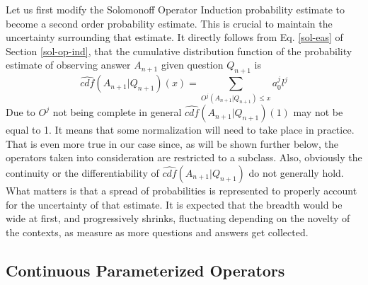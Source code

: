 \documentclass[runningheads]{llncs}
\begin{document}
Let us first modify the Solomonoff Operator Induction probability
estimate to become a second order probability estimate. This is
crucial to maintain the uncertainty surrounding that estimate.
It directly follows from Eq. \ref{sol-eas} of Section
\ref{sol-op-ind}, that the cumulative distribution function of the
probability estimate of observing answer $A_{n+1}$ given question
$Q_{n+1}$ is
\begin{equation}
  \label{sol-cdf}
\hat{cdf}(A_{n+1}|Q_{n+1})(x) = \sum_{O^j(A_{n+1}|Q_{n+1}) \le x} a_0^j l^j
\end{equation}
Due to $O^j$ not being complete in general
$\hat{cdf}(A_{n+1}|Q_{n+1})(1)$ may not be equal to 1. It means that
some normalization will need to take place in practice. That is even
more true in our case since, as will be shown further below, the
operators taken into consideration are restricted to a subclass.
Also, obviously the continuity or the differentiability of
$\hat{cdf}(A_{n+1}|Q_{n+1})$ do not generally hold. What matters is
that a spread of probabilities is represented to properly account for
the uncertainty of that estimate. It is expected that the breadth
would be wide at first, and progressively shrinks, fluctuating
depending on the novelty of the contexts, as measure as more questions
and answers get collected.

\subsection{Continuous Parameterized Operators}


\end{document}
